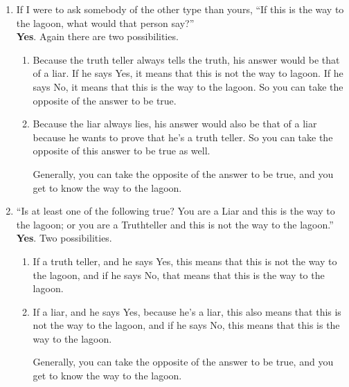 \documentclass[11pt]{article}
\begin{document}
\begin{enumerate}
\begin{enumerate}
\begin{enumerate}
				\item If I were to ask somebody of the other type than yours, “If this is the way to the lagoon, what would that person say?”\\
				\textbf{Yes}. Again there are two possibilities. 
				\begin{enumerate}
					\item Because the truth teller always tells the truth, his answer would be that of a liar. If he says Yes, it means that this is not the way to lagoon. If he says No, it means that this is the way to the lagoon. So you can take the opposite of the answer to be true. 
					\item Because the liar always lies, his answer would also be that of a liar because he wants to prove that he's a truth teller. So you can take the opposite of this answer to be true as well. 
					
					Generally, you can take the opposite of the answer to be true, and you get to know the way to the lagoon.
					
				\end{enumerate}
				
				\item “Is at least one of the following true? You are a Liar and this is the way to the lagoon; or you are a Truthteller and this is not the way to the lagoon.”\\
				\textbf{Yes}. Two possibilities. 
				\begin{enumerate}
					\item If a truth teller, and he says Yes, this means that this is not the way to the lagoon, and if he says No, that means that this is the way to the lagoon. 
					\item If a liar, and he says Yes, because he's a liar, this also means that this is not the way to the lagoon, and if he says No, this means that this is the way to the lagoon. 
					
					Generally, you can take the opposite of the answer to be true, and you get to know the way to the lagoon.
				\end{enumerate}
				
			\end{enumerate}	
			
		\end{enumerate}
		
		
	\end{enumerate}
	
\end{document}
